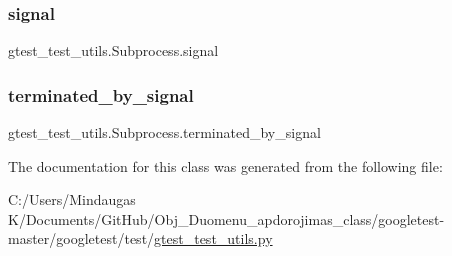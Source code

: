 \subsubsection{\texorpdfstring{signal}{signal}}
{\footnotesize\ttfamily gtest\+\_\+test\+\_\+utils.\+Subprocess.\+signal}

\mbox{\label{classgtest__test__utils_1_1_subprocess_a9654b9eddd43c93acf66d5c7b0026fca}} 
\subsubsection{\texorpdfstring{terminated\_by\_signal}{terminated\_by\_signal}}
{\footnotesize\ttfamily gtest\+\_\+test\+\_\+utils.\+Subprocess.\+terminated\+\_\+by\+\_\+signal}



The documentation for this class was generated from the following file\+:\begin{DoxyCompactItemize}
\item 
C\+:/\+Users/\+Mindaugas K/\+Documents/\+Git\+Hub/\+Obj\+\_\+\+Duomenu\+\_\+apdorojimas\+\_\+class/googletest-\/master/googletest/test/\mbox{\hyperlink{googletest-master_2googletest_2test_2gtest__test__utils_8py}{gtest\+\_\+test\+\_\+utils.\+py}}\end{DoxyCompactItemize}
